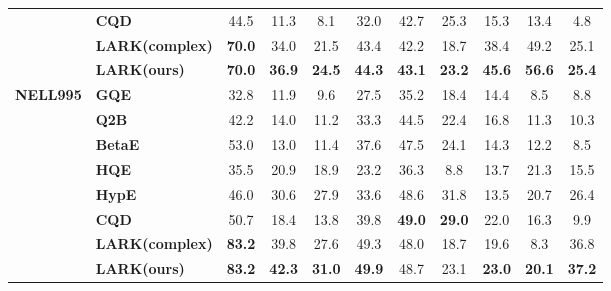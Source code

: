 \documentclass{article} %
\newcommand{\model}{LARK}
\begin{document}
\begin{table}[htbp]
\begin{tabular}{l|l|ccccccccc}
&\textbf{CQD}               & 44.5 & 11.3 & 8.1  & 32.0   & 42.7 & 25.3 & 15.3 & 13.4 & 4.8  \\
&\textbf{{\model}(complex)}  & \textbf{70.0}&34.0&21.5&43.4&42.2&18.7&38.4&49.2&25.1\\
&\textbf{{\model}(ours)}  & \textbf{70.0}&\textbf{36.9}&\textbf{24.5}&\textbf{44.3}&\textbf{43.1}&\textbf{23.2}&\textbf{45.6}&\textbf{56.6}&\textbf{25.4}\\
\hline
\textbf{NELL995} &\textbf{GQE}       & 32.8 & 11.9 & 9.6  & 27.5 & 35.2 & 18.4 & 14.4 & 8.5  & 8.8  \\
&\textbf{Q2B}         & 42.2 & 14.0   & 11.2 & 33.3 & 44.5 & 22.4 & 16.8 & 11.3 & 10.3 \\
&\textbf{BetaE}             & 53.0   & 13.0   & 11.4 & 37.6 & 47.5 & 24.1 & 14.3 & 12.2 & 8.5  \\
&\textbf{HQE}               & 35.5 & 20.9 & 18.9 & 23.2 & 36.3 & 8.8  & 13.7 & 21.3 & 15.5 \\
&\textbf{HypE}              & 46.0   & 30.6 & 27.9 & 33.6 & 48.6 & 31.8 & 13.5 & 20.7 & 26.4 \\
&\textbf{CQD}               & 50.7 & 18.4 & 13.8 & 39.8 & \textbf{49.0}   & \textbf{29.0}   & 22.0   & 16.3 & 9.9  \\
&\textbf{{\model}(complex)} & \textbf{83.2}&39.8&27.6&49.3&48.0&18.7&19.6&8.3&36.8\\
&\textbf{{\model}(ours)} & \textbf{83.2}&\textbf{42.3}&\textbf{31.0}&\textbf{49.9}&48.7&23.1&\textbf{23.0}&\textbf{20.1}&\textbf{37.2}\\
\hline
\end{tabular}
\vspace{-1em}
\label{tab:mrr_standard}
\end{table}
\end{document}
